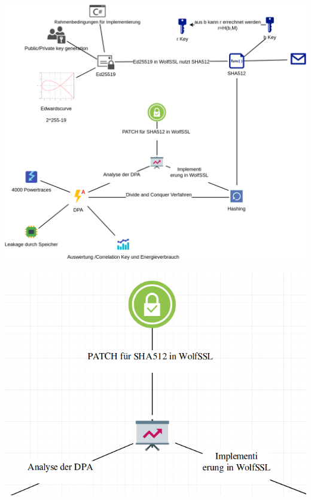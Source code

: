 \documentclass[
  11 pt,
  ignorenonframetext,
  aspectratio=43,
]{beamer}
\begin{document}
\begin{frame}{}
\protect\hypertarget{section-23}{}
\includegraphics{Abbildungen/ITSEC(1)_res.png}
\end{frame}

\begin{frame}{}
\protect\hypertarget{section-24}{}
\includegraphics{Abbildungen/Punkt5.png}
\end{frame}
\end{document}

